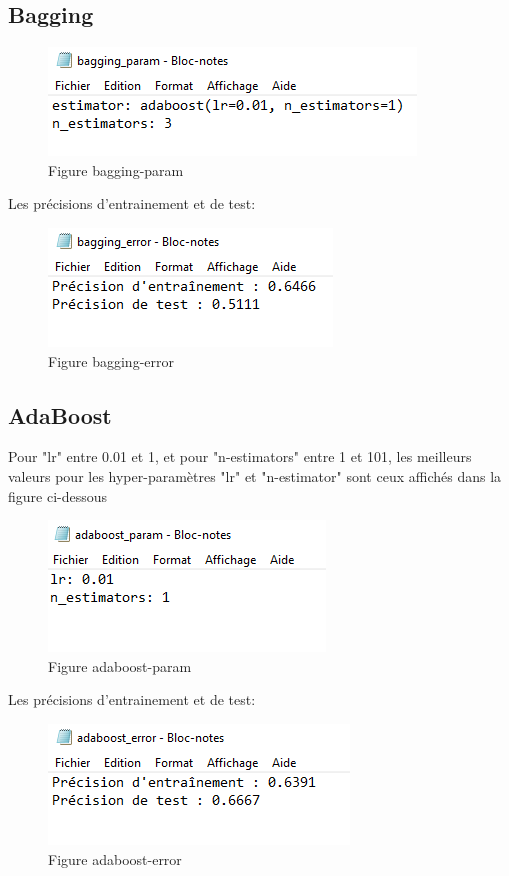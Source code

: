 \subsection{Bagging}
\begin{figure}[H]
    \centering
    \includegraphics{bagging_param.PNG}
    \caption{Figure bagging-param }
    \label{Figure fichier bagging-param }
\end{figure}
\par Les précisions d'entrainement et de test:
\begin{figure}[H]
    \centering
    \includegraphics{bagging.PNG}
    \caption{Figure bagging-error }
    \label{Figure fichier bagging-error }
\end{figure}
\subsection{AdaBoost} 
\par Pour "lr" entre 0.01 et 1, et pour "n-estimators" entre 1 et 101, les meilleurs valeurs pour les hyper-paramètres "lr" et "n-estimator" sont ceux affichés dans la figure ci-dessous
\begin{figure}[H]
    \centering
    \includegraphics{adaboost_param.PNG}
    \caption{Figure adaboost-param }
    \label{Figure fichier adaboost-param }
\end{figure}
\par Les précisions d'entrainement et de test:
\begin{figure}[H]
    \centering
    \includegraphics{adaboost.PNG}
    \caption{Figure adaboost-error }
    \label{Figure fichier adaboost-error }
\end{figure}
